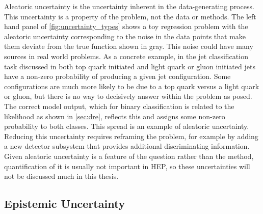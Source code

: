 Aleatoric uncertainty is the uncertainty inherent in the data-generating process.
This uncertainty is a property of the problem, not the data or methods.
The left hand panel of \cref{fig:uncertainty_types} shows a toy regression problem with the aleatoric uncertainty corresponding to the noise in the data points that make them deviate from the true function shown in gray.
This noise could have many sources in real world problems.
As a concrete example, in the jet classification task discussed in  both top quark initiated and light quark or gluon initiated jets have a non-zero probability of producing a given jet configuration.
Some configurations are much more likely to be due to a top quark versus a light quark or gluon, but there is no way to decisively answer within the problem as posed.
The correct model output, which for binary classification is related to the likelihood as shown in \cref{sec:dre}, reflects this and assigns some non-zero probability to both classes.
This spread is an example of aleatoric uncertainty.
Reducing this uncertainty requires reframing the problem, for example by adding a new detector subsystem that provides additional discriminating information.
Given aleatoric uncertainty is a feature of the question rather than the method, quantification of it is usually not important in HEP, so these uncertainties will not be discussed much in this thesis.

\subsection{Epistemic Uncertainty}
\label{sec:epistemic}

